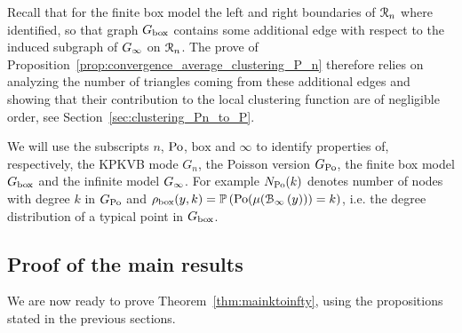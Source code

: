 
Recall that for the finite box model the left and right boundaries of ${\mathcal R}_n$ where identified, so that graph $G_{\text{box}}$ contains some additional edge with respect to the induced subgraph of $G_{\infty}$ on ${\mathcal R}_n$. The prove of Proposition~\ref{prop:convergence_average_clustering_P_n} therefore relies on analyzing the number of triangles coming from these additional edges and showing that their contribution to the local clustering function are of negligible order, see Section~\ref{sec:clustering_Pn_to_P}. 

\begin{remark}
We will use the subscripts $n$, ${\mathrm{Po}}$, $\text{box}$ and $\infty$ to identify properties of, respectively, the KPKVB mode $G_n$, the Poisson version $G_{\text{Po}}$, the finite box model $G_{\text{box}}$ and the infinite model $G_{\infty}$. For example $N_{{\mathrm{Po}}}(k)$ denotes number of nodes with degree $k$ in $G_{\text{Po}}$ and $\rho_{\text{box}}(y,k) = \mathbb{P}\left({\mathrm{Po}}(\mu({\mathcal B}_{\infty}\left(y\right))) = k\right)$, i.e. the degree distribution of a typical point in $G_{\text{box}}$.
\end{remark}

\subsection{Proof of the main results}\label{ssec:proof_main_result_diverging_k}

We are now ready to prove Theorem~\ref{thm:mainktoinfty}, using the propositions stated in the previous sections.

